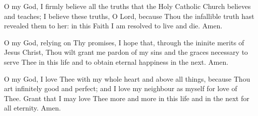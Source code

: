 
O my God, I firmly believe all the truths that the Holy Catholic Church believes and teaches; I believe these truths, O Lord, because Thou the infallible truth hast revealed them to her: in this Faith I am resolved to live and die.  Amen.



O my God, relying on Thy promises, I hope that, through the ininite merits of Jesus Christ, Thou wilt grant me pardon of my sins and the graces necessary to serve Thee in this life and to obtain eternal happiness in the next. Amen.



O my God, I love Thee with my whole heart and above all things, because Thou art infinitely good and perfect; and I love my neighbour as myself for love of Thee.  Grant that I may love Thee more and more in this life and in the next for all eternity.  Amen.



\eject

